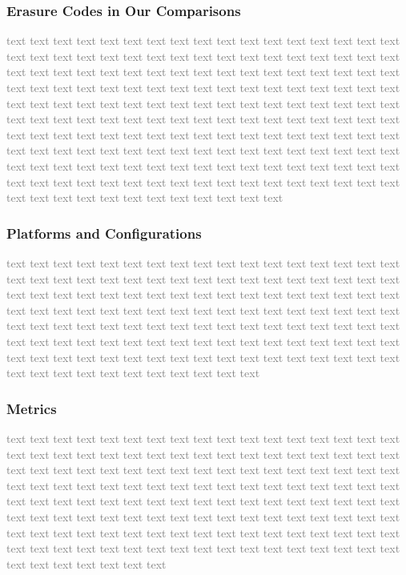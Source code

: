 \documentclass[sigconf]{acmart}
\begin{document}
\subsubsection{Erasure Codes in Our Comparisons}
\textcolor{gray}{
    text text text text text text text text text text text text text text text text text text text text text text text text text text text text text text text text text text text text text text text text text text text text text text text text text text text text text text text text text text text text text text text text text text text text text text text text text text text text text text text text text text text text text text text text text text text text text text text text text text text text text text text text text text text text text text text text text text text text text text text text text text text text text text text text text text text text text text text text text text text text text text text text text text text text text text text text text text text text text text text text text text text text text text text text text text text text text text text text text text text text text text
}

\subsubsection{Platforms and Configurations}
\textcolor{gray}{
    text text text text text text text text text text text text text text text text text text text text text text text text text text text text text text text text text text text text text text text text text text text text text text text text text text text text text text text text text text text text text text text text text text text text text text text text text text text text text text text text text text text text text text text text text text text text text text text text text text text text text text text text text text text text text text text text text text text text text text text text text text text text text text text text text text
}

\subsubsection{Metrics}
\textcolor{gray}{
    text text text text text text text text text text text text text text text text text text text text text text text text text text text text text text text text text text text text text text text text text text text text text text text text text text text text text text text text text text text text text text text text text text text text text text text text text text text text text text text text text text text text text text text text text text text text text text text text text text text text text text text text text text text text text text text text text text text text text text text text text text text text text text text text text text text text text text text text text text text text text text text
}
\end{document}
